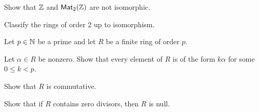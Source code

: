 \begin{exercise}
Show that \(\mathbb{Z}\) and \(\mathsf{Mat}_{2}(\mathbb{Z})\) are not isomorphic.
\end{exercise}

\begin{exercise}
Classify the rings of order 2 up to isomorphism.
\end{exercise}

\begin{exercise}
Let \(p \in \mathbb{N}\) be a prime and let \(R\) be a finite ring of order \(p\).
\begin{proplist}
\item Let \(\alpha \in R\) be nonzero. Show that every element of \(R\) is of the form \(k\alpha\) for some \(0 \leq k < p\).
\item Show that \(R\) is commutative.
\item Show that if \(R\) contains zero divisors, then \(R\) is null.
\end{proplist}
\end{exercise}
